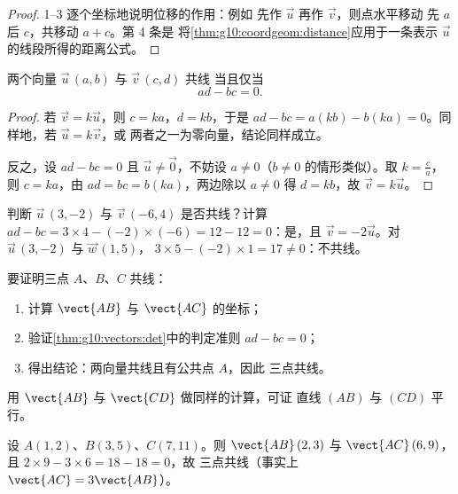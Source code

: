 \begin{proof}
1--3 逐个坐标地说明位移的作用：例如
先作 $\vec u$ 再作 $\vec v$，则点水平移动
先 $a$ 后 $c$，共移动 $a + c$。第 4 条是
将\cref{thm:g10:coordgeom:distance}应用于一条表示
$\vec u$ 的线段所得的距离公式。
\end{proof}

\begin{theorem}[共线判定准则]\label{thm:g10:vectors:det}
两个向量 $\vec u\,(a, b)$ 与 $\vec v\,(c, d)$ 共线
当且仅当
\[
ad - bc = 0 .
\]
\end{theorem}

\begin{proof}
若 $\vec v = k\vec u$，则 $c = ka$，$d = kb$，于是
$ad - bc = a(kb) - b(ka) = 0$。同样地，若 $\vec u = k \vec v$，或
两者之一为零向量，结论同样成立。

反之，设 $ad - bc = 0$ 且 $\vec u \neq \vec 0$，不妨设
$a \neq 0$（$b \neq 0$ 的情形类似）。取 $k = \frac{c}{a}$，则
$c = ka$，由 $ad = bc = b(ka)$，两边除以 $a \neq 0$ 得
$d = kb$，故 $\vec v = k\vec u$。
\end{proof}

\begin{example}\label{ex:g10:vectors:det}
判断 $\vec u\,(3, -2)$ 与 $\vec v\,(-6, 4)$ 是否共线？计算
$ad - bc = 3 \times 4 - (-2)\times(-6) = 12 - 12 = 0$：是，且
$\vec v = -2\vec u$。对 $\vec u\,(3, -2)$ 与 $\vec w\,(1, 5)$，
$3 \times 5 - (-2) \times 1 = 17 \neq 0$：不共线。
\end{example}

\begin{method}[三点共线与平行的证明]\label{met:g10:vectors:alignment}
要证明三点 $A$、$B$、$C$ 共线：
\begin{enumerate}
  \item 计算 $\vect{AB}$ 与 $\vect{AC}$ 的坐标；
  \item 验证\cref{thm:g10:vectors:det}中的判定准则 $ad - bc = 0$；
  \item 得出结论：两向量共线且有公共点 $A$，因此
        三点共线。
\end{enumerate}
用 $\vect{AB}$ 与 $\vect{CD}$ 做同样的计算，可证
直线 $(AB)$ 与 $(CD)$ 平行。
\end{method}

\begin{example}\label{ex:g10:vectors:alignment}
设 $A(1, 2)$、$B(3, 5)$、$C(7, 11)$。则 $\vect{AB}\,(2, 3)$ 与
$\vect{AC}\,(6, 9)$，且 $2 \times 9 - 3 \times 6 = 18 - 18 = 0$，故
三点共线（事实上 $\vect{AC} = 3\vect{AB}$）。
\end{example}

